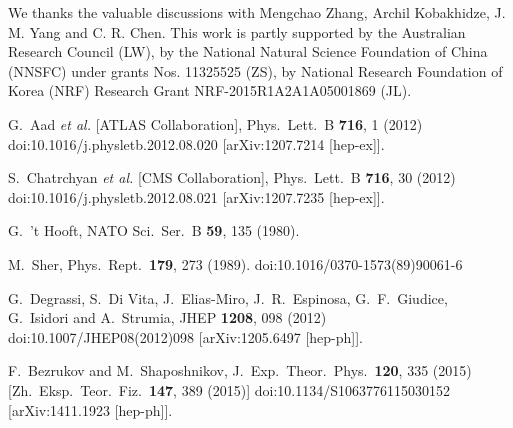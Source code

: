\documentclass[twocolumn,prd,noshowpacs,nofootinbib,amsmath,amssymb,superscriptaddress,preprintnumbers]{revtex4}
\begin{document}
\acknowledgments
We thanks the valuable discussions with Mengchao Zhang, Archil Kobakhidze, J. M. Yang and C. R. Chen. This work is partly supported by the Australian Research Council (LW), by the National Natural Science Foundation of China (NNSFC) under grants Nos. 11325525 (ZS), by National Research Foundation of Korea (NRF) Research Grant NRF-2015R1A2A1A05001869 (JL).


\begin{thebibliography}{99}

  G.~Aad {\it et al.} [ATLAS Collaboration],
  Phys.\ Lett.\ B {\bf 716}, 1 (2012)
  doi:10.1016/j.physletb.2012.08.020
  [arXiv:1207.7214 [hep-ex]].

  S.~Chatrchyan {\it et al.} [CMS Collaboration],
  Phys.\ Lett.\ B {\bf 716}, 30 (2012)
  doi:10.1016/j.physletb.2012.08.021
  [arXiv:1207.7235 [hep-ex]].



  G.~'t Hooft,
  NATO Sci.\ Ser.\ B {\bf 59}, 135 (1980).

  M.~Sher,
  Phys.\ Rept.\  {\bf 179}, 273 (1989).
  doi:10.1016/0370-1573(89)90061-6

  G.~Degrassi, S.~Di Vita, J.~Elias-Miro, J.~R.~Espinosa, G.~F.~Giudice, G.~Isidori and A.~Strumia,
  JHEP {\bf 1208}, 098 (2012)
  doi:10.1007/JHEP08(2012)098
  [arXiv:1205.6497 [hep-ph]].

  F.~Bezrukov and M.~Shaposhnikov,
  J.\ Exp.\ Theor.\ Phys.\  {\bf 120}, 335 (2015)
  [Zh.\ Eksp.\ Teor.\ Fiz.\  {\bf 147}, 389 (2015)]
  doi:10.1134/S1063776115030152
  [arXiv:1411.1923 [hep-ph]].


\end{thebibliography}
\end{document}
